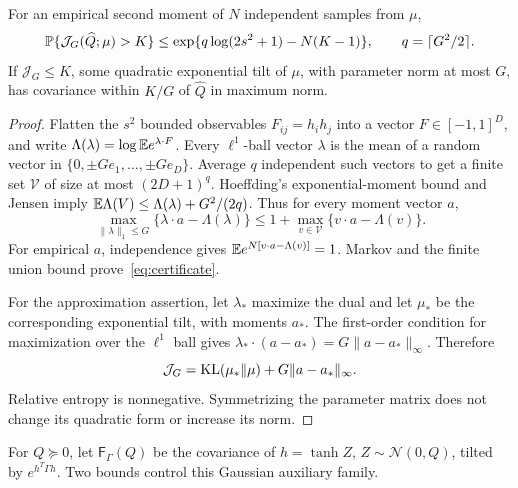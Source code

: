 \begin{lemma}\label{lem:certificate}
For an empirical second moment of $N$ independent samples from $\mu$,
\begin{equation}\label{eq:certificate}
 \mathbb P\{\mathcal J_G(\widehat Q;\mu)>K\}
 \leq\exp\{q\log(2s^2+1)-N(K-1)\},
 \qquad q=\lceil G^2/2\rceil.
\end{equation}
If $\mathcal J_G\leq K$, some quadratic exponential tilt of $\mu$,
with parameter norm at most $G$, has covariance within $K/G$ of
$\widehat Q$ in maximum norm.
\end{lemma}
\begin{proof}
Flatten the $s^2$ bounded observables $F_{ij}=h_ih_j$ into a vector
$F\in[-1,1]^D$, and write
$\Lambda(\lambda)=\log\mathbb E e^{\lambda\cdot F}$.
Every $\ell^1$-ball vector $\lambda$ is the mean of a random vector
in $\{0,\pm Ge_1,\ldots,\pm Ge_D\}$. Average $q$ independent such
vectors to get a finite set $\mathcal V$ of size at most $(2D+1)^q$.
Hoeffding's exponential-moment bound and Jensen imply
$\mathbb E\Lambda(V)\leq\Lambda(\lambda)+G^2/(2q)$.
Thus for every moment vector $a$,
\[
 \max_{\|\lambda\|_1\leq G}\{\lambda\cdot a-\Lambda(\lambda)\}
 \leq1+\max_{v\in\mathcal V}\{v\cdot a-\Lambda(v)\}.
\]
For empirical $a$, independence gives
$\mathbb E e^{N[v\cdot a-\Lambda(v)]}=1$. Markov and the finite union
bound prove~\eqref{eq:certificate}.

For the approximation assertion, let $\lambda_*$ maximize the dual and
let $\mu_*$ be the corresponding exponential tilt, with moments $a_*$.
The first-order condition for maximization over the $\ell^1$ ball gives
$\lambda_*\cdot(a-a_*)=G\|a-a_*\|_\infty$. Therefore
\[
 \mathcal J_G=\mathrm{KL}(\mu_*\Vert\mu)+G\|a-a_*\|_\infty.
\]
Relative entropy is nonnegative. Symmetrizing the parameter matrix does
not change its quadratic form or increase its norm.
\end{proof}

For $Q\succeq0$, let $\mathsf F_\Gamma(Q)$ be the covariance of
$h=\tanh Z$, $Z\sim\mathcal N(0,Q)$, tilted by $e^{h^T\Gamma h}$.
Two bounds control this Gaussian auxiliary family.

